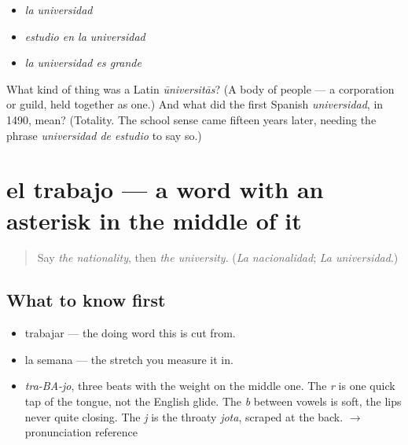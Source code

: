\begin{itemize}
\raggedright
  \item \emph{la universidad}
  \item \emph{estudio en la universidad}
  \item \emph{la universidad es grande}
\end{itemize}

\begin{tcolorbox}[breakable,colback=teal!4,colframe=teal!35!black,title={Before you move on}]
What kind of thing was a Latin \emph{ūniversitās}? (A body of people — a corporation or guild, held together as one.) And what did the first Spanish \emph{universidad}, in 1490, mean? (Totality. The school sense came fifteen years later, needing the phrase \emph{universidad de estudio} to say so.)
\end{tcolorbox}
\section[el trabajo]{el trabajo — a word with an asterisk in the middle of it}

\label{lesson:ES-C394-trabajo}



\begin{quote}
Say \emph{the nationality}, then \emph{the university}. (\emph{La nacionalidad}; \emph{La universidad}.)
\end{quote}

\subsection*{What to know first}
\begin{itemize}
\raggedright
  \item trabajar — the doing word this is cut from.
  \item la semana — the stretch you measure it in.
\end{itemize}

\begin{sounds}
\begin{itemize}
\raggedright
  \item \emph{tra-BA-jo}, three beats with the weight on the middle one. The \emph{r} is one quick tap of the tongue, not the English glide. The \emph{b} between vowels is soft, the lips never quite closing. The \emph{j} is the throaty \emph{jota}, scraped at the back. $\to$ pronunciation reference
\end{itemize}
\end{sounds}

